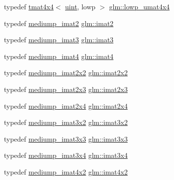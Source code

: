 \begin{DoxyCompactItemize}
typedef \hyperlink{structglm_1_1tmat4x4}{tmat4x4}$<$ \hyperlink{group__core__precision_ga4fd29415871152bfb5abd588334147c8}{uint}, lowp $>$ \hyperlink{group__gtc__matrix__integer_ga6ec13ea43b4328e29219f8515c188997}{glm\+::lowp\+\_\+umat4x4}
\item 
typedef \hyperlink{group__gtc__matrix__integer_gae812330b83568359273b6ec96b002863}{mediump\+\_\+imat2} \hyperlink{group__gtc__matrix__integer_ga77a581b3366fb63fc72f8f20830003e0}{glm\+::imat2}
\item 
typedef \hyperlink{group__gtc__matrix__integer_gab033bd6a2bfebb1aa35d458c6f077ccb}{mediump\+\_\+imat3} \hyperlink{group__gtc__matrix__integer_ga45481922dd07a3a8e23758286311ee97}{glm\+::imat3}
\item 
typedef \hyperlink{group__gtc__matrix__integer_ga680c97868de08658ca4924718d951def}{mediump\+\_\+imat4} \hyperlink{group__gtc__matrix__integer_ga40fc5c5e0b07543497aa1c314891544a}{glm\+::imat4}
\item 
typedef \hyperlink{group__gtc__matrix__integer_ga52a40f2f95562746fd8084726a300963}{mediump\+\_\+imat2x2} \hyperlink{group__gtc__matrix__integer_gaf7f44f44d966377666d41ed059524732}{glm\+::imat2x2}
\item 
typedef \hyperlink{group__gtc__matrix__integer_ga07314e9f05b82367570ca44c3ef7c0a7}{mediump\+\_\+imat2x3} \hyperlink{group__gtc__matrix__integer_ga143bc5177bac9991d84b70da03952516}{glm\+::imat2x3}
\item 
typedef \hyperlink{group__gtc__matrix__integer_ga944a139f15de6bc12e9c7bf615ffc4f5}{mediump\+\_\+imat2x4} \hyperlink{group__gtc__matrix__integer_gafe2d058e164fd1badace451ffcf4ae46}{glm\+::imat2x4}
\item 
typedef \hyperlink{group__gtc__matrix__integer_ga8f682b5b64e2072c0729409ee6bfe2af}{mediump\+\_\+imat3x2} \hyperlink{group__gtc__matrix__integer_ga04deef94cdfdd3b3b2706e10a32ef7f3}{glm\+::imat3x2}
\item 
typedef \hyperlink{group__gtc__matrix__integer_gab4c647321a342c58119144ad08c6c406}{mediump\+\_\+imat3x3} \hyperlink{group__gtc__matrix__integer_gaeff9ef8f56cccc828d6b897923e75402}{glm\+::imat3x3}
\item 
typedef \hyperlink{group__gtc__matrix__integer_ga721a754fc35cc5ac097e331d893a6b2c}{mediump\+\_\+imat3x4} \hyperlink{group__gtc__matrix__integer_gaee5507e6cbbdd05841a0c174e60dd036}{glm\+::imat3x4}
\item 
typedef \hyperlink{group__gtc__matrix__integer_gabfe107153637dfd7a0c272ff1ba892ed}{mediump\+\_\+imat4x2} \hyperlink{group__gtc__matrix__integer_ga7e733984837e0e7aa9f4aac18f632f63}{glm\+::imat4x2}

\end{DoxyCompactItemize}
